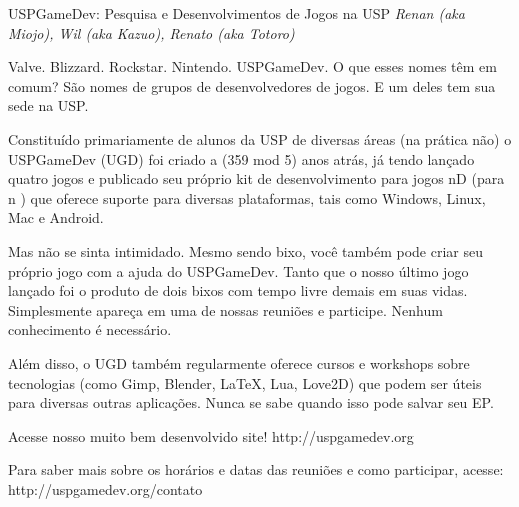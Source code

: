\begin{secao}{USPGameDev: Pesquisa e Desenvolvimentos de Jogos na USP}
{\em Renan (aka Miojo), Wil (aka Kazuo), Renato (aka Totoro)} %

Valve. Blizzard. Rockstar. Nintendo. USPGameDev. O que esses nomes têm em comum?
São nomes de grupos de desenvolvedores de jogos. E um deles tem sua sede na USP.

Constituído primariamente de alunos da USP de diversas áreas (na prática não) o 
USPGameDev (UGD) foi criado a (359 mod 5) anos atrás, já tendo lançado quatro jogos e 
publicado seu próprio kit de desenvolvimento para jogos nD (para n ) que 
oferece suporte para diversas plataformas, tais como Windows, Linux, Mac e Android. 

Mas não se sinta intimidado. Mesmo sendo bixo, você também pode criar seu
próprio jogo com a ajuda do USPGameDev. Tanto que o nosso último jogo lançado
foi o produto de dois bixos com tempo livre demais em suas vidas. Simplesmente
apareça em uma de nossas reuniões e participe. Nenhum conhecimento é necessário.

Além disso, o UGD também regularmente oferece cursos e workshops sobre tecnologias
(como Gimp, Blender, LaTeX, Lua, Love2D) que podem ser úteis para
diversas outras aplicações. Nunca se sabe quando isso pode
salvar seu EP.

Acesse nosso muito bem desenvolvido site! 
http://uspgamedev.org

Para saber mais sobre os horários e datas das reuniões e como participar, acesse:
http://uspgamedev.org/contato

\end{secao}



